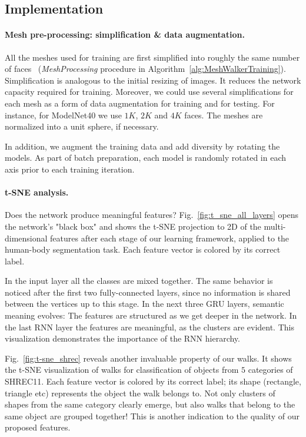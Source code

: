 \documentclass[acmtog]{acmart}
\begin{document}
\subsection{Implementation}
\label{subsec:implementation}

\paragraph{Mesh pre-processing: simplification \& data augmentation.}
\label{subsec:preprocessing}
All the meshes used for training are first simplified into roughly the same number of faces~\cite{garland1997surface, hoppe1997view} ({\em MeshProcessing} procedure in Algorithm~\ref{alg:MeshWalkerTraining}).
Simplification is analogous to the initial resizing of images.
It reduces the network capacity required for training. 
Moreover, we could use several simplifications for each mesh as a form of data augmentation for training and for testing. 
For instance, for ModelNet40 we use $1K$, $2K$ and $4K$ faces.
The meshes are normalized into a unit sphere, if necessary.


In addition, we augment the training data and add diversity by rotating the models. 
As part of batch preparation, each model is randomly rotated in each  axis prior to each training iteration.


\paragraph{t-SNE analysis.}
Does the network produce meaningful features?  
Fig.~\ref{fig:t_sne_all_layers} opens the network's "black box" and shows the t-SNE  projection to 2D of the multi-dimensional features after each stage of our learning framework, applied to the human-body segmentation task.
Each feature vector is colored by its correct label. 

In the input layer all the classes are mixed together. 
The same behavior is noticed after the first two fully-connected layers, since no information is shared between the vertices up to this stage. 
In the next three GRU layers, semantic meaning evolves:
The features are structured as we get deeper in the network.
In the last RNN layer the features are meaningful, as the clusters are evident. 
This visualization demonstrates the importance of the RNN hierarchy.


Fig.~\ref{fig:t-sne_shrec} reveals another invaluable property of our walks.
It shows the t-SNE visualization of walks for classification of objects from $5$ categories of  SHREC11.
Each feature vector is colored by its correct label; its shape (rectangle, triangle etc) represents the object the walk belongs to.
Not only clusters of shapes from the same category clearly emerge, but also walks that belong to the same object are grouped together!
This is another indication to the quality of our proposed features.
\end{document}

